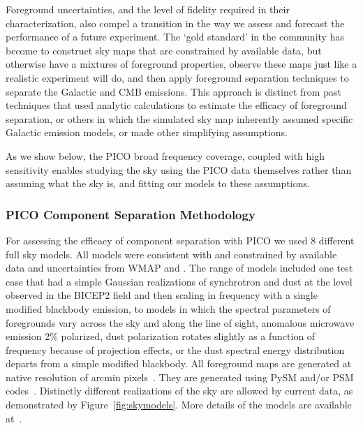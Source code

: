\documentclass[PICOReport.tex]{subfiles}
\begin{document}
Foreground uncertainties, and the level of fidelity required in their characterization, also compel a transition in the way we assess and forecast the performance of a future experiment. The `gold standard' in the community has become to construct sky maps that are constrained by available data, but otherwise have a mixtures of foreground properties, observe these maps just like a realistic experiment will do, and then apply foreground separation techniques to separate the Galactic and CMB emissions. This approach is distinct from past techniques that used analytic calculations to estimate the efficacy of foreground separation, or others in which the simulated sky map inherently assumed specific Galactic emission models, or made other simplifying assumptions.  

 As we show below, the PICO broad frequency coverage, coupled with high sensitivity enables studying the sky using the PICO data themselves rather than assuming what the sky is, and fitting our models to these assumptions. 

\subsubsection{PICO Component Separation Methodology}

 \hspace{0.1in} For assessing the efficacy of component separation with PICO we used 8 different full sky models. All models were consistent with and constrained by available data and uncertainties from WMAP and \planck . The range of models included one test case that had a simple Gaussian realizations of synchrotron and dust at the level observed in the BICEP2 field and then scaling in frequency with a single modified blackbody emission, to models in which the spectral parameters of foregrounds vary across the sky and along the line of sight, anomalous microwave emission  2\% polarized, dust polarization rotates slightly as a function of frequency because of projection effects, or the dust spectral energy distribution departs from a simple modified blackbody. All foreground maps are generated at native resolution of  arcmin pixels~\citep{healpix}. They are generated using PySM and/or PSM codes~\citep{??}.   Distinctly different realizations of the sky are allowed by current data, as demonstrated by Figure~\ref{fig:skymodels}. More details of the models are available at~\citet{foregroundappendix}.
\end{document}

